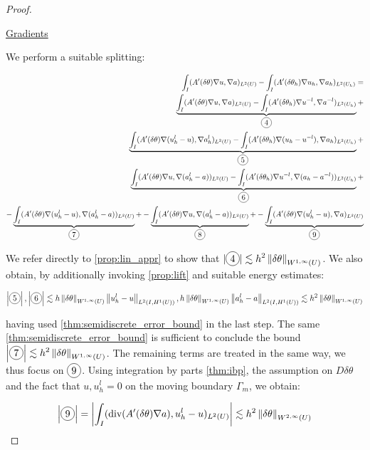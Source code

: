 \documentclass[english,a4paper,9pt,oneside]{scrbook}	%
\theoremstyle{break}
\newenvironment{mproof}[1][\proofname]{%
  \begin{proof}[#1]$ $\par\nobreak\ignorespaces
}{%
  \end{proof}
}
\renewcommand*{\proofname}{Proof}
\theoremstyle{remark}
\newcommand{\ds}{\displaystyle}
\newcommand{\norm}[1]{\left\lVert#1\right\rVert}
\newcommand{\te}{\theta}
\newcommand{\dive}{\text{div}}
\newcommand*\circled[1]{\tikz[baseline=(char.base)]{
            \node[shape=circle,draw,inner sep=2pt] (char) {#1};}}
\begin{document}
\begin{mproof}
\underline{Gradients}

We perform a suitable splitting:

\begin{align*}
	\int_I (A'(\delta\te )\nabla u, \nabla a)_{L^2(U)}-\int_I (A'(\delta\te_h )\nabla u_h, \nabla a_h)_{L^2(U_h)} = \\
	\underbrace{\int_I (A'(\delta\te )\nabla u, \nabla a)_{L^2(U)} - \int_I (A'(\delta\te_h )\nabla u^{-l}, \nabla a^{-l})_{L^2(U_h)}}_{\circled{4}}+\\
	\underbrace{\int_I (A'(\delta\te )\nabla (u_h^l-u), \nabla a_h^l)_{L^2(U)} - \int_I (A'(\delta\te_h )\nabla (u_h - u^{-l}), \nabla a_h)_{L^2(U_h)}}_{\circled{5}}+\\
	\underbrace{\int_I (A'(\delta\te )\nabla u, \nabla (a_h^l-a))_{L^2(U)} - \int_I (A'(\delta\te_h )\nabla u^{-l}, \nabla (a_h-a^{-l}))_{L^2(U_h)}}_{\circled{6}}+\\
	- \underbrace{\int_I (A'(\delta\te )\nabla (u_h^l-u), \nabla (a_h^l-a))_{L^2(U)}}_{\circled{7}}+
	- \underbrace{\int_I (A'(\delta\te )\nabla u, \nabla (a_h^l-a))_{L^2(U)}}_{\circled{8}}+
	- \underbrace{\int_I (A'(\delta\te )\nabla (u_h^l-u), \nabla a)_{L^2(U)}}_{\circled{9}}
\end{align*}

We refer directly to \cref{prop:lin_appr} to show that $\ds |\circled{4}|\lesssim h^2\norm{\delta \te}_{W^{1,\infty}(U)}$. We also obtain, by additionally invoking \cref{prop:lift} and suitable energy estimates:

\begin{align*}
	\left | \circled{5} \right |, \left | \circled{6} \right |\lesssim h \norm{\delta \te}_{W^{1,\infty}(U)} \norm{u_h^l-u}_{L^2(I,H^1(U))},  h \norm{\delta \te}_{W^{1,\infty}(U)} \norm{a_h^l-a}_{L^2(I,H^1(U))}\lesssim h^2 \norm{\delta \te}_{W^{1,\infty}(U)}
\end{align*}

having used \cref{thm:semidiscrete_error_bound} in the last step. The same \cref{thm:semidiscrete_error_bound} is sufficient to conclude the bound $\ds \left | \circled{7} \right | \lesssim h^2 \norm{\delta \te}_{W^{1,\infty}(U)}$. The remaining terms are treated in the same way, we thus focus on $\circled{9}$. Using integration by parts \cref{thm:ibp}, the assumption on $D\delta \te$ and the fact that $u, u^l_h=0$ on the moving boundary $\Gamma_m$, we obtain:

\begin{align*}
	\left |\circled{9} \right |= \left |\int_I(\dive(A'(\delta \te)\nabla a), u_h^l-u)_{L^2(U)}\right |\lesssim h^2 \norm{\delta \te}_{W^{2,\infty}(U)}
\end{align*}


\end{mproof}
\end{document}
